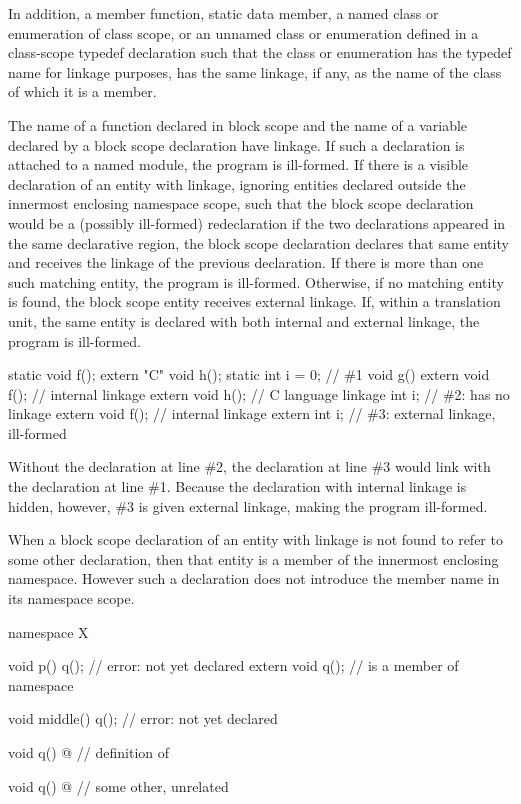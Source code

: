 \pnum
In addition, a member function, static data member, a named class or
enumeration of class scope, or an unnamed class or enumeration defined
in a class-scope typedef declaration such that the class or enumeration
has the typedef name for linkage purposes, has
the same linkage, if any, as the name of the class of which it is a
member.

\pnum
The name of a function declared in block scope and
the name of a variable declared by a block scope  declaration
have linkage.
If such a declaration is attached to a named module,
the program is ill-formed.
If there is a visible declaration
of an entity with linkage, ignoring entities declared
outside the innermost enclosing namespace scope,
such that the block scope declaration would be
a (possibly ill-formed) redeclaration
if the two declarations appeared in the same declarative region,
the block scope declaration declares
that same entity and receives the linkage of the previous declaration. If there is more
than one such matching entity, the program is ill-formed. Otherwise, if no matching
entity is found, the block scope entity receives external linkage.
If, within a translation unit, the same entity is declared with both
internal and external linkage, the program is ill-formed.
\begin{example}
\begin{codeblock}
static void f();
extern "C" void h();
static int i = 0;               // \#1
void g() {
  extern void f();              // internal linkage
  extern void h();              // C language linkage
  int i;                        // \#2:  has no linkage
  {
    extern void f();            // internal linkage
    extern int i;               // \#3: external linkage, ill-formed
  }
}
\end{codeblock}

Without the declaration at line \#2,
the declaration at line \#3 would link with the declaration at line \#1.
Because the declaration with internal linkage is hidden, however,
\#3 is given external linkage, making the program ill-formed.
\end{example}

\pnum
When a block scope declaration of an entity with linkage is not found to
refer to some other declaration, then that entity is a member of the
innermost enclosing namespace. However such a declaration does not
introduce the member name in its namespace scope. \begin{example}

\begin{codeblock}
namespace X {
  void p() {
    q();                        // error:  not yet declared
    extern void q();            //  is a member of namespace 
  }

  void middle() {
    q();                        // error:  not yet declared
  }

  void q() { @\commentellip@ }        // definition of 
}

void q() { @\commentellip@ }          // some other, unrelated 
\end{codeblock}
\end{example}

